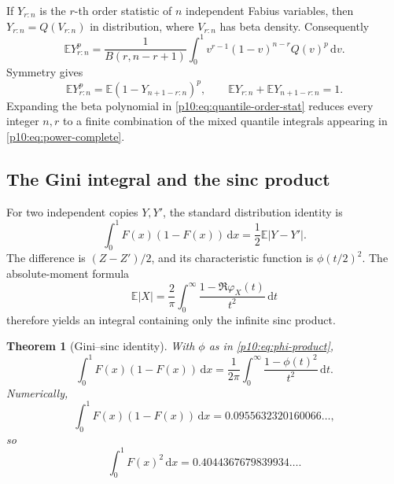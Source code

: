 \documentclass[11pt,oneside]{article}
\newtheorem{theorem}{Theorem}[section]
\theoremstyle{definition}
\theoremstyle{remark}
\newcommand{\F}{F}
\newcommand{\Q}{Q}
\newcommand{\E}{\mathbb E}
\newcommand{\dd}{\,\mathrm d}
\newcommand{\1}{\mathbf 1}
\begin{document}
If \(Y_{r:n}\) is the \(r\)-th order statistic of \(n\) independent Fabius variables,
then \(Y_{r:n}=\Q(V_{r:n})\) in distribution, where \(V_{r:n}\) has beta density.
Consequently
\begin{equation}\label{p10:eq:quantile-order-stat}
 \E Y_{r:n}^p
 =\frac1{B(r,n-r+1)}
 \int_0^1v^{r-1}(1-v)^{n-r}\Q(v)^p\dd v.
\end{equation}
Symmetry gives
\begin{equation}\label{p10:eq:order-stat-symmetry}
 \E Y_{r:n}^p
 =\E(1-Y_{n+1-r:n})^p,
 \qquad
 \E Y_{r:n}+\E Y_{n+1-r:n}=1.
\end{equation}
Expanding the beta polynomial in \cref{p10:eq:quantile-order-stat} reduces every integer
\(n,r\) to a finite combination of the mixed quantile integrals appearing in
\cref{p10:eq:power-complete}.

\subsection{The Gini integral and the sinc product}

For two independent copies \(Y,Y'\), the standard distribution identity is
\begin{equation}\label{p10:eq:Gini-prob}
 \int_0^1\F(x)(1-\F(x))\dd x
 =\frac12\E|Y-Y'|.
\end{equation}
The difference is \((Z-Z')/2\), and its characteristic function is
\(\phi(t/2)^2\).  The absolute-moment formula
\begin{equation}\label{p10:eq:absolute-char}
 \E|X|=\frac2\pi\int_0^\infty
 \frac{1-\Re\varphi_X(t)}{t^2}\dd t
\end{equation}
therefore yields an integral containing only the infinite sinc product.

\begin{theorem}[Gini--sinc identity]\label{p10:thm:gini-sinc}
With \(\phi\) as in \cref{p10:eq:phi-product},
\begin{equation}\label{p10:eq:Gini-sinc}
 \boxed{\displaystyle
 \int_0^1\F(x)(1-\F(x))\dd x
 =\frac1{2\pi}\int_0^\infty
 \frac{1-\phi(t)^2}{t^2}\dd t.}
\end{equation}
Numerically,
\begin{equation}\label{p10:eq:Gini-numeric}
 \int_0^1\F(x)(1-\F(x))\dd x
 =0.0955632320160066\ldots,
\end{equation}
so
\begin{equation}\label{p10:eq:F2-numeric}
 \int_0^1\F(x)^2\dd x
 =0.4044367679839934\ldots.
\end{equation}
\end{theorem}
\end{document}
